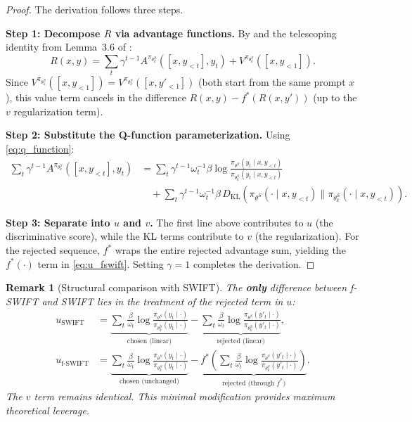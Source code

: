 \documentclass[11pt,a4paper]{article}
\newtheorem{remark}[theorem]{Remark}
\newcommand{\DKL}{D_{\mathrm{KL}}}
\begin{document}
\begin{proof}
The derivation follows three steps.

\textbf{Step 1: Decompose $R$ via advantage functions.} By  and the telescoping identity from Lemma~3.6 of \cite{le2025swift}:
\[
    R(x, y) = \sum_t \gamma^{t-1} A^{\pi_{\theta^S_k}}\!([x, y_{<t}], y_t) + V^{\pi_{\theta^S_k}}([x, y_{<1}]).
\]
Since $V^{\pi_{\theta^S_k}}([x, y_{<1}]) = V^{\pi_{\theta^S_k}}([x, y'_{<1}])$ (both start from the same prompt $x$), this value term cancels in the difference $R(x,y) - f^*(R(x,y'))$ (up to the $v$ regularization term).

\textbf{Step 2: Substitute the Q-function parameterization.} Using \eqref{eq:q_function}:
\begin{align*}
    \sum_t \gamma^{t-1} A^{\pi_{\theta^S_k}}\!([x, y_{<t}], y_t) &= \sum_t \gamma^{t-1} \omega_t^{-1} \beta \log \frac{\pi_{\theta^S}(y_t \mid x, y_{<t})}{\pi_{\theta^S_k}(y_t \mid x, y_{<t})} \\
    &\quad + \sum_t \gamma^{t-1} \omega_t^{-1} \beta\, \DKL\!\left(\pi_{\theta^S}(\cdot \mid x, y_{<t}) \| \pi_{\theta^S_k}(\cdot \mid x, y_{<t})\right).
\end{align*}

\textbf{Step 3: Separate into $u$ and $v$.} The first line above contributes to $u$ (the discriminative score), while the KL terms contribute to $v$ (the regularization). For the rejected sequence, $f^*$ wraps the entire rejected advantage sum, yielding the $f^*(\cdot)$ term in \eqref{eq:u_fswift}. Setting $\gamma = 1$ completes the derivation.
\end{proof}

\begin{remark}[Structural comparison with SWIFT]
The \textbf{only} difference between f-SWIFT and SWIFT lies in the treatment of the rejected term in $u$:
\begin{align}
    u_{\mathrm{SWIFT}} &= \underbrace{\sum_t \frac{\beta}{\omega_t} \log \frac{\pi_{\theta^S}(y_t \mid \cdot)}{\pi_{\theta^S_k}(y_t \mid \cdot)}}_{\text{chosen (linear)}} - \underbrace{\sum_t \frac{\beta}{\omega_t} \log \frac{\pi_{\theta^S}(y'_t \mid \cdot)}{\pi_{\theta^S_k}(y'_t \mid \cdot)}}_{\text{rejected (linear)}}, \label{eq:u_swift_compare} \\[4pt]
    u_{\text{f-SWIFT}} &= \underbrace{\sum_t \frac{\beta}{\omega_t} \log \frac{\pi_{\theta^S}(y_t \mid \cdot)}{\pi_{\theta^S_k}(y_t \mid \cdot)}}_{\text{chosen (unchanged)}} - \underbrace{f^*\!\left(\sum_t \frac{\beta}{\omega_t} \log \frac{\pi_{\theta^S}(y'_t \mid \cdot)}{\pi_{\theta^S_k}(y'_t \mid \cdot)}\right)}_{\text{rejected (through } f^* \text{)}}. \label{eq:u_fswift_compare}
\end{align}
The $v$ term remains identical. This minimal modification provides maximum theoretical leverage.
\end{remark}
\end{document}
